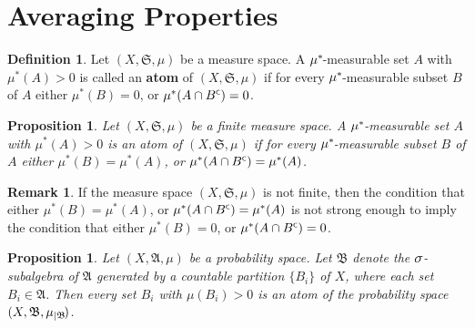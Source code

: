 \documentclass[
twoside=true,
paper=letter,
fontsize=11pt,
pagesize=auto,
leqno,
openany,
headsepline,
overfullrule,
]{scrbook}
\theoremstyle{plain}
\theoremstyle{plain}
\newtheorem{prop}[thm]{Proposition}
\theoremstyle{definition}
\newtheorem{defn}[thm]{Definition}
\newtheorem{rmk}[thm]{Remark}
\theoremstyle{bfnoteitalic}
\theoremstyle{bfnoteroman}
\newcommand{\term}[1]{\textbf{#1}\index{#1}}
\newcommand{\sigalg}[1]{\mathfrak{#1}}
\newcommand{\textsigma}{\hbox{\large{$\sigma$}}\kern-1pt}
\newcommand{\restrictedto}[1]{_{\lvert#1}\kern-1.5pt}
\newcommand{\comp}{^{\hbox{\tiny{$\mathsf C$}}}}
\newcommand{\meets}{\cap}
\newcommand{\semiring}{\sigalg{S}}
\newcommand{\sigmaalgebra}{\sigalg{A}}
\newcommand{\sigmaalgebraii}{\sigalg{B}}
\newcommand{\kernast}{\ast\kern-1pt}
\newcommand{\sigalgb}{\sigmaalgebraii}
\newcommand{\measurespace}{X}
\newcommand{\measure}{\mu}
\begin{document}
\section{Averaging Properties}
%




\begin{defn}
Let $(\measurespace, \semiring, \measure)$ be a measure space.  A $\measure^\kernast$-measurable set $A$ with $\measure^*(A)>0$ is called an \term{atom} of $(\measurespace, \semiring, \measure)$ if for every $\measure^\kernast$-measurable subset $B$ of $A$ either $\measure^*(B) = 0$, or $\measure^*(A\meets B\comp)=0$. 
\end{defn}



\begin{prop}\label{atom}
Let $(\measurespace, \semiring, \measure)$ be a finite measure space.  A $\measure^\kernast$-measurable set $A$ with $\measure^*(A)>0$ is an atom of $(\measurespace, \semiring, \measure)$ if for every $\measure^\kernast$-measurable subset $B$ of $A$ either $\measure^*(B) = \measure^*(A)$, or $\measure^*(A\meets B\comp)= \measure^*(A)$. 
\end{prop}



\begin{rmk}
If the measure space $(\measurespace, \semiring, \measure)$ is not finite, then the condition that either $\measure^*(B) = \measure^*(A)$, or $\measure^*(A\meets B\comp)= \measure^*(A)$
is not strong enough to imply the condition that
either $\measure^*(B) = 0$, or $\measure^*(A\meets B\comp)=0$. 
\end{rmk}



\begin{prop}\label{countable_partition_of_atoms}
Let $(\measurespace, \sigmaalgebra,\measure)$ be a probability space.
Let $\sigalgb$ denote the $\textsigma$-subalgebra of $\sigmaalgebra$ generated by a countable partition $\{B_i\}$ of $\measurespace$, where each set $B_i\in\sigmaalgebra$. Then every set $B_i$ with 
$\measure(B_i) > 0$ is an atom of the probability space
$(\measurespace, \sigalgb,\measure\restrictedto{\sigalgb})$.
\end{prop}
\end{document}
